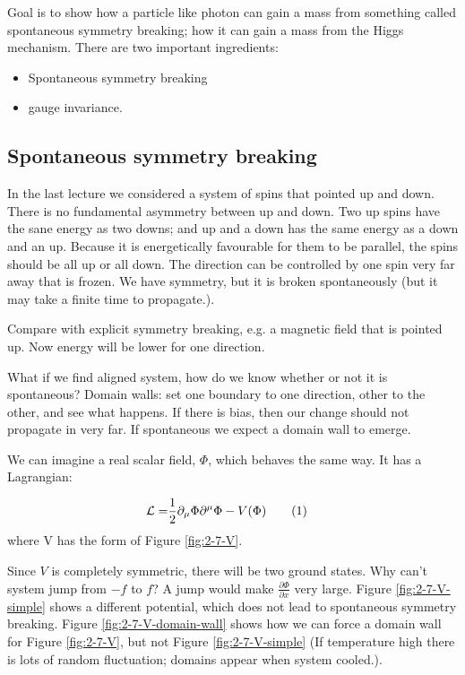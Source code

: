 \documentclass[]{article}
\newcommand\numberthis{\addtocounter{equation}{1}\tag{\theequation}}
\begin{document}
Goal is to show how a particle like photon can gain a mass from something called spontaneous symmetry breaking; how it can gain a mass from the Higgs mechanism. There are two important ingredients:

\begin{itemize}
	\item Spontaneous symmetry breaking
	\item gauge invariance.
\end{itemize}

\subsection{Spontaneous symmetry breaking}
In the last lecture we considered a system of spins that pointed up and down.
There is no fundamental asymmetry between up and down. Two up spins have the sane energy as two downs; and up and a down has the same energy as a down and an up. Because it is energetically favourable for them to be parallel, the spins should be all up or all down. The direction can be controlled by one spin very far away that is frozen. We have symmetry, but it is broken spontaneously (but it may take a finite time to propagate.).

Compare with explicit symmetry breaking, e.g. a magnetic field that is pointed up. Now energy will be lower for one direction.

What if we find aligned system, how do we know whether or not it is spontaneous? Domain walls: set one boundary to one direction, other to the other, and see what happens. If there is bias, then our change should not propagate in very far. If spontaneous we expect a domain wall to emerge.

We can imagine a real scalar field, $\Phi$, which behaves the same way. It has a Lagrangian:

\begin{align*}
	\mathcal{L} =& \frac{1}{2} \partial_\mu \Phi \partial^\mu \Phi - V(\Phi) \numberthis \label{eq:spontaneous:symmetry:L}
\end{align*}
where V has the form of Figure \ref{fig:2-7-V}.

Since $V$ is completely symmetric, there will be two ground states. Why can't system jump from $-f$ to $f$? A jump would make $\frac{\partial \Phi}{\partial x}$ very large. Figure \ref{fig:2-7-V-simple} shows a different potential, which does not lead to spontaneous symmetry breaking. Figure \ref{fig:2-7-V-domain-wall} shows how we can force a domain wall for Figure \ref{fig:2-7-V}, but not Figure \ref{fig:2-7-V-simple} (If temperature high there is lots of random fluctuation; domains appear when system cooled.).
\end{document}
